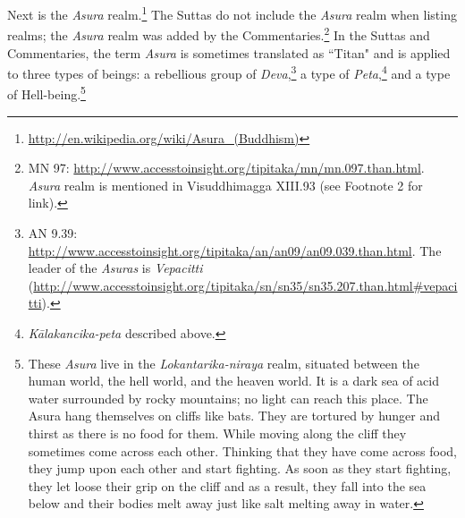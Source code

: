 Next is the \textit{Asura} realm.\footnote{\url{http://en.wikipedia.org/wiki/Asura_(Buddhism)}} The Suttas do not include the \textit{Asura} realm when listing realms; the \textit{Asura} realm was added by the Commentaries.\footnote{MN 97: \url{http://www.accesstoinsight.org/tipitaka/mn/mn.097.than.html}. \textit{Asura} realm is mentioned in Visuddhimagga XIII.93 (see Footnote 2 for link).} In the Suttas and Commentaries, the term \textit{Asura} is sometimes translated as ``Titan" and is applied to three types of beings: a rebellious group of \textit{Deva},\footnote{AN 9.39: \url{http://www.accesstoinsight.org/tipitaka/an/an09/an09.039.than.html}. The leader of the \textit{Asuras} is \textit{Vepacitti} (\url{http://www.accesstoinsight.org/tipitaka/sn/sn35/sn35.207.than.html\#vepacitti}).} a type of \textit{Peta},\footnote{\textit{Kālakancika-peta} described above.} and a type of Hell-being.\footnote{These \textit{Asura} live in the \textit{Lokantarika-niraya} realm, situated between the human world, the hell world, and the heaven world. It is a dark sea of acid water surrounded by rocky mountains; no light can reach this place. The Asura hang themselves on cliffs like bats. They are tortured by hunger and thirst as there is no food for them. While moving along the cliff they sometimes come across each other. Thinking that they have come across food, they jump upon each other and start fighting. As soon as they start fighting, they let loose their grip on the cliff and as a result, they fall into the sea below and their bodies melt away just like salt melting away in water.}

\pagebreak

\pagebreak

